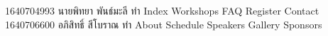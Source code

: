 1640704993 นายพิทยา พันธ์มะลี 
ทำ Index Workshops FAQ Register Contact
1640706600 อภิสิทธิ์ สีโบราณ   
ทำ About Schedule Speakers Gallery Sponsors 
